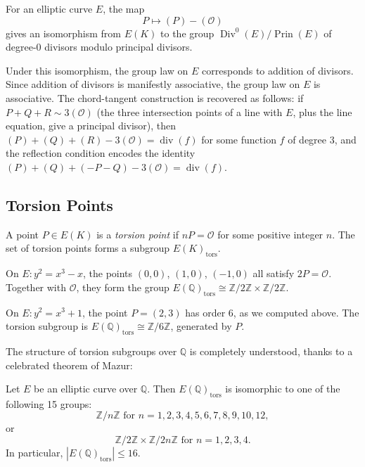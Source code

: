 \begin{theorem}
For an elliptic curve $E$, the map
\[
P \mapsto (P) - (\mathcal{O})
\]
gives an isomorphism from $E(K)$ to the group $\operatorname{Div}^0(E)/\operatorname{Prin}(E)$ of degree-0 divisors modulo principal divisors.
\end{theorem}

Under this isomorphism, the group law on $E$ corresponds to addition of divisors. Since addition of divisors is manifestly associative, the group law on $E$ is associative. The chord-tangent construction is recovered as follows: if $P + Q + R \sim 3(\mathcal{O})$ (the three intersection points of a line with $E$, plus the line equation, give a principal divisor), then $(P) + (Q) + (R) - 3(\mathcal{O}) = \operatorname{div}(f)$ for some function $f$ of degree 3, and the reflection condition encodes the identity $(P) + (Q) + (-P-Q) - 3(\mathcal{O}) = \operatorname{div}(f)$.

\subsection{Torsion Points}

\begin{definition}
A point $P \in E(K)$ is a \textit{torsion point} if $nP = \mathcal{O}$ for some positive integer $n$. The set of torsion points forms a subgroup $E(K)_{\mathrm{tors}}$.
\end{definition}

\begin{example}
On $E: y^2 = x^3 - x$, the points $(0,0)$, $(1,0)$, $(-1,0)$ all satisfy $2P = \mathcal{O}$. Together with $\mathcal{O}$, they form the group $E(\mathbb{Q})_{\mathrm{tors}} \cong \mathbb{Z}/2\mathbb{Z} \times \mathbb{Z}/2\mathbb{Z}$.
\end{example}

\begin{example}
On $E: y^2 = x^3 + 1$, the point $P = (2,3)$ has order 6, as we computed above. The torsion subgroup is $E(\mathbb{Q})_{\mathrm{tors}} \cong \mathbb{Z}/6\mathbb{Z}$, generated by $P$.
\end{example}

The structure of torsion subgroups over $\mathbb{Q}$ is completely understood, thanks to a celebrated theorem of Mazur:

\begin{theorem}[Mazur, 1977]
Let $E$ be an elliptic curve over $\mathbb{Q}$. Then $E(\mathbb{Q})_{\mathrm{tors}}$ is isomorphic to one of the following 15 groups:
\[
\mathbb{Z}/n\mathbb{Z} \text{ for } n = 1, 2, 3, 4, 5, 6, 7, 8, 9, 10, 12,
\]
or
\[
\mathbb{Z}/2\mathbb{Z} \times \mathbb{Z}/2n\mathbb{Z} \text{ for } n = 1, 2, 3, 4.
\]
In particular, $|E(\mathbb{Q})_{\mathrm{tors}}| \le 16$.
\end{theorem}

